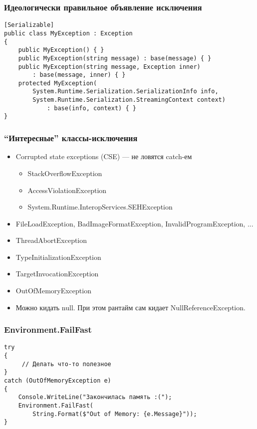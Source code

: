 \documentclass{../../slides-style}
\begin{document}
    \begin{frame}[fragile]
        \frametitle{Идеологически правильное объявление исключения}
        \begin{verbatim}
[Serializable]
public class MyException : Exception
{
    public MyException() { }
    public MyException(string message) : base(message) { }
    public MyException(string message, Exception inner) 
        : base(message, inner) { }
    protected MyException(
        System.Runtime.Serialization.SerializationInfo info,
        System.Runtime.Serialization.StreamingContext context)
            : base(info, context) { }
}
        \end{verbatim}
    \end{frame}

    \begin{frame}
        \frametitle{``Интересные'' классы-исключения}
        \begin{itemize}
            \item Corrupted state exceptions (CSE) --- не ловятся catch-ем
            \begin{itemize}
                \item StackOverflowException
                \item AccessViolationException
                \item System.Runtime.InteropServices.SEHException
            \end{itemize}
            \item FileLoadException, BadImageFormatException, InvalidProgramException, ...
            \item ThreadAbortException
            \item TypeInitializationException
            \item TargetInvocationException
            \item OutOfMemoryException
            \item Можно кидать null. При этом рантайм сам кидает NullReferenceException.
        \end{itemize}
    \end{frame}

    \begin{frame}[fragile]
        \frametitle{Environment.FailFast}
        \begin{verbatim}
try 
{
     // Делать что-то полезное
}
catch (OutOfMemoryException e) 
{
    Console.WriteLine("Закончилась память :(");
    Environment.FailFast(
        String.Format($"Out of Memory: {e.Message}"));
}
        \end{verbatim}
    \end{frame}
\end{document}
